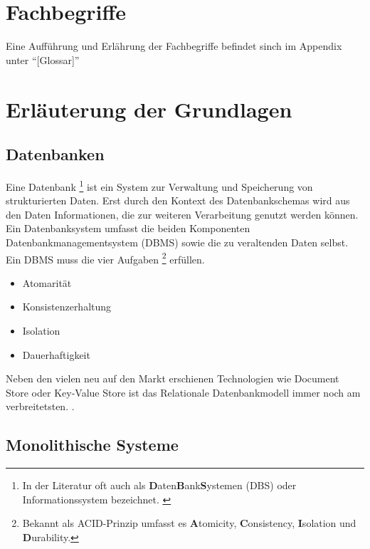 \documentclass[oneside,11pt,parskip=half,ngerman]{scrreprt}
\begin{document}
\section{Fachbegriffe}\label{fachbegriffe}

Eine Aufführung und Erlährung der Fachbegriffe befindet sinch im
Appendix unter \enquote{{[}Glossar{]}}

\section{Erläuterung der
Grundlagen}\label{erluxe4uterung-der-grundlagen}

\subsection{Datenbanken}\label{datenbanken}

Eine Datenbank \footnote{In der Literatur oft auch als
  \textbf{D}aten\textbf{B}ank\textbf{S}ystemen (DBS) oder
  Informationssystem bezeichnet. \autocite[ pp.~3-4]{rupDatenbanken}}
ist ein System zur Verwaltung und Speicherung von strukturierten Daten.
Erst durch den Kontext des Datenbankschemas wird aus den Daten
Informationen, die zur weiteren Verarbeitung genutzt werden können. Ein
Datenbanksystem umfasst die beiden Komponenten Datenbankmanagementsystem
(DBMS) sowie die zu veraltenden Daten selbst.\\Ein DBMS muss die vier
Aufgaben \footnote{Bekannt als ACID-Prinzip \autocite[
  pp.105]{rupDatenbanken} umfasst es \textbf{A}tomicity,
  \textbf{C}onsistency, \textbf{I}solation und \textbf{D}urability.}
erfüllen.

\begin{itemize}
\itemsep1pt\parskip0pt
\item
  Atomarität
\item
  Konsistenzerhaltung
\item
  Isolation
\item
  Dauerhaftigkeit
\end{itemize}

Neben den vielen neu auf den Markt erschienen Technologien wie Document
Store oder Key-Value Store ist das Relationale Datenbankmodell immer
noch am verbreitetsten. \autocite{dbenginesranking}.

\subsection{Monolithische Systeme}\label{monolithische-systeme}
\end{document}

